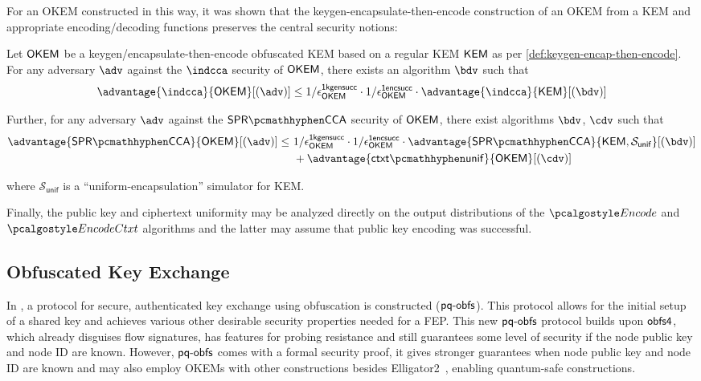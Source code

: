For an OKEM constructed in this way, it was shown \cite[Theorems 2.12 and 2.13]{CCS:GunSteVei24} that the keygen-encapsulate-then-encode construction of an OKEM from a KEM and appropriate encoding/decoding functions preserves the central security notions:

\begin{theorem}\label{thm:keygen-encap-then-encode-security}

    Let $\mathsf{OKEM}$ be a keygen/encapsulate-then-encode obfuscated KEM based on a regular KEM $\mathsf{KEM}$ as per \cref{def:keygen-encap-then-encode}.
    For any adversary $\adv$ against the $\indcca$ security of $\mathsf{OKEM}$, there exists an algorithm $\bdv$ such that
    \[
        \advantage{\indcca}{\OKEM}[(\adv)]
        \leq
        1/\epsilon^\firstkeygensuccess_\OKEM
        \cdot 1/\epsilon^\firstencapssuccess_\OKEM
        \cdot \advantage{\indcca}{\KEM}[(\bdv)]
    \]

    Further, for any adversary $\adv$ against the $\sprcca$ security of $\mathsf{OKEM}$, there exist algorithms $\bdv$, $\cdv$ such that
    \begin{align*}
        \advantage{\sprcca}{\OKEM}[(\adv)]
        \leq\ 
        & 1/\epsilon^\firstkeygensuccess_\OKEM 
        \cdot 1/\epsilon^\firstencapssuccess_\OKEM
        \cdot \advantage{\sprcca}{\KEM, \mathcal S_\mathsf{unif}}[(\bdv)] \\
        &+ \advantage{\ctxtunif}{\OKEM}[(\cdv)]
    \end{align*}
    
    where $\mathcal S_\mathsf{unif}$ is a ``uniform-encapsulation'' simulator for KEM.
\end{theorem}

Finally, the public key and ciphertext uniformity may be analyzed directly on the output distributions of the $\encode$ and $\encodectxt$ algorithms and the latter may assume that public key encoding was successful.

\subsection{Obfuscated Key Exchange}

In \cite{CCS:GunSteVei24}, a protocol for secure, authenticated key exchange using obfuscation is constructed ($\textsf{pq-obfs}$). This protocol allows for the initial setup of a shared key and achieves various other desirable security properties needed for a FEP.
This new $\textsf{pq-obfs}$ protocol builds upon $\textsf{obfs4}$, which already disguises flow signatures, has features for probing resistance and still guarantees some level of security if the node public key and node ID are known.
However, $\textsf{pq-obfs}$ comes with a formal security proof, it gives stronger guarantees when node public key and node ID are known and may also employ OKEMs with other constructions besides \textsf{Elligator2}~\cite{CCS:BHKL13}, enabling quantum-safe constructions.

